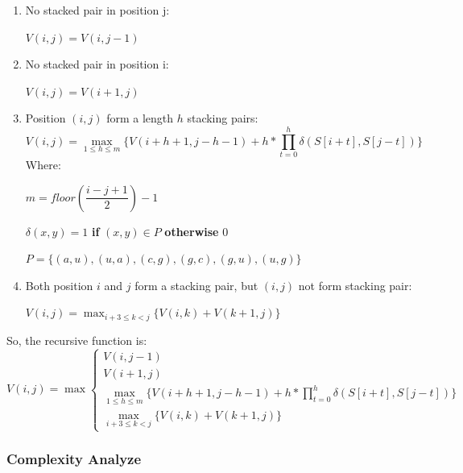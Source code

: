 \documentclass[10pt]{article}
\begin{document}
\begin{enumerate}  
    \item No stacked pair in position j:
    \begin{center} $V(i,j)=V(i,j-1)$ \end{center}
    \item No stacked pair in position i:
    \begin{center} $V(i,j)=V(i+1,j)$ \end{center}
    \item Position $(i,j)$ form a length $h$ stacking pairs:
    \begin{equation}
    \label{eq:max_stack_case3}
    V(i,j)=\max_{1 \leq h \leq m }{
        \{ V(i+h+1,j-h-1)+ h* \prod_{t=0}^{h} \delta(S[i+t], S[j-t]) \}
    }
    \end{equation}
    Where:
    \begin{center} $m = floor(\dfrac{i-j+1}{2})-1$ \end{center}
    \begin{center} $\delta(x,y)=1$ \textbf{if} $(x,y) \in P$ \textbf{otherwise} $0$ \end{center}
    \begin{center} $P = \{(a,u),(u,a),(c,g),(g,c),(g,u),(u,g)\}$ \end{center}
    \item Both position $i$ and $j$ form a stacking pair, but $(i,j)$ not form stacking pair:
    \begin{center} $V(i,j) = \displaystyle\max_{i+3\leq k<j}\{V(i,k) + V(k+1,j)\}$ \end{center}
\end{enumerate}

So, the recursive function is:
\begin{equation}
    V(i,j)=\max\begin{cases}
        V(i,j-1) \\
        V(i+1,j) \\
        \displaystyle\max_{1 \leq h \leq m }{ \{ V(i+h+1,j-h-1)+ h* \prod_{t=0}^{h} \delta(S[i+t], S[j-t]) \}} \\
        \displaystyle\max_{i+3\leq k<j}\{V(i,k) + V(k+1,j)\}
    \end{cases}
\end{equation}

\noindent
\subsubsection{Complexity Analyze}
\label{ana:max_stack}
\end{document}
